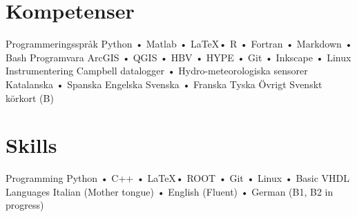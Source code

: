 \ifswedish
  \section{Kompetenser}
    \skill
      {Programmeringsspråk}
      {Python • Matlab • \LaTeX • R • Fortran • Markdown • Bash}
    \skill
      {Programvara}
      {ArcGIS • QGIS • HBV • HYPE • Git • Inkscape • Linux}
    \skill
      {Instrumentering}
      {Campbell datalogger • Hydro-meteorologiska sensorer}
    \languages
      {Katalanska • Spanska}
      {Engelska}
      {Svenska • Franska}
      {Tyska}
    \skill
      {Övrigt}
      {Svenskt körkort (B)}
\else
  \section{Skills}
    \skill
      {Programming}
      {Python • C++ • \LaTeX • ROOT • Git • Linux • Basic VHDL}
    \skill
      {Languages}
      {Italian (Mother tongue) • English (Fluent) • German (B1, B2 in progress)}
   \fi
